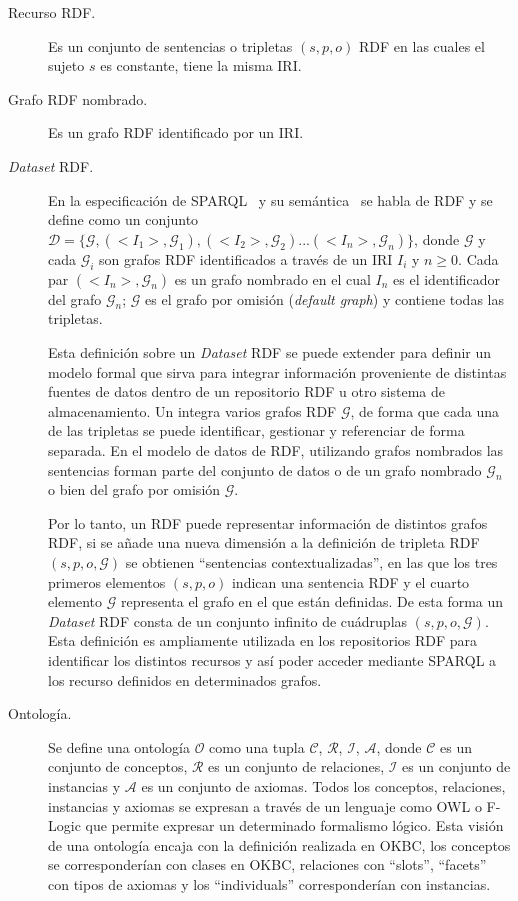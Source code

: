 \begin{description}
\item [Recurso RDF.] Es un conjunto de sentencias o tripletas $(s,p,o)$ RDF en las cuales el sujeto $s$ 
es constante, tiene la misma IRI.

\item [Grafo RDF nombrado.] Es un grafo RDF identificado por un IRI. 

\item [\textit{Dataset} RDF.] En la especificación de SPARQL~\cite{Sparql} y su semántica~\cite{SparqlSemantics} se habla
de \dataset RDF y se define como un conjunto $\mathcal{D} = \{\mathcal{G}, (<I_1>, \mathcal{G}_1), (<I_2>, \mathcal{G}_2)...(<I_n>,\mathcal{G}_n)\}$,
donde $\mathcal{G}$ y cada $\mathcal{G}_i$ son grafos RDF identificados a través de un IRI $I_i$ y $n\geq0$.
 Cada par $(<I_n>, \mathcal{G}_n)$ es un grafo nombrado en el cual $I_n$ es el identificador del grafo
$\mathcal{G}_n$; $\mathcal{G}$ es el grafo por omisión (\textit{default graph}) y contiene
todas las tripletas. 

Esta definición sobre un \textit{Dataset} RDF se puede extender para definir un modelo formal que sirva
para integrar información proveniente de distintas fuentes de datos dentro de un
repositorio RDF u otro sistema de almacenamiento. Un \dataset integra varios grafos RDF
$\mathcal{G}$, de forma que cada una de las tripletas se puede identificar, gestionar y referenciar
de forma separada. En el modelo de datos de RDF, utilizando grafos nombrados las sentencias forman parte del conjunto de datos o de un 
grafo nombrado $\mathcal{G}_n$ o bien del grafo por omisión $\mathcal{G}$.

Por lo tanto, un \dataset RDF puede representar información de distintos grafos RDF, si se añade
una nueva dimensión a la definición de tripleta RDF $(s,p,o,\mathcal{G})$ se obtienen 
``sentencias contextualizadas'', en las que los tres primeros elementos $(s,p,o)$ indican
una sentencia RDF y el cuarto elemento $\mathcal{G}$ representa el grafo en el que están
definidas. De esta forma un \textit{Dataset} RDF consta de un conjunto infinito de cuádruplas $(s,p,o,\mathcal{G})$. 
Esta definición es ampliamente utilizada en los repositorios RDF para identificar los distintos recursos y así
poder acceder mediante SPARQL a los recurso definidos en determinados grafos.


\item [Ontología.] Se define una ontología $\mathcal{O}$ como una tupla $\mathcal{C}$, $\mathcal{R}$, $\mathcal{I}$, $\mathcal{A}$, donde $\mathcal{C}$ es un conjunto de conceptos,  $\mathcal{R}$ es un conjunto de relaciones, $\mathcal{I}$ es un 
conjunto de instancias y  $\mathcal{A}$ es un conjunto de axiomas. Todos los conceptos, relaciones, instancias
y axiomas se expresan a través de un lenguaje como OWL o F-Logic que permite expresar un determinado formalismo lógico. 
Esta visión de una ontología encaja con la definición realizada en OKBC, los conceptos se corresponderían con clases en OKBC, relaciones con ``slots'', ``facets'' con tipos de axiomas y los ``individuals'' 
corresponderían con instancias.


\end{description}
